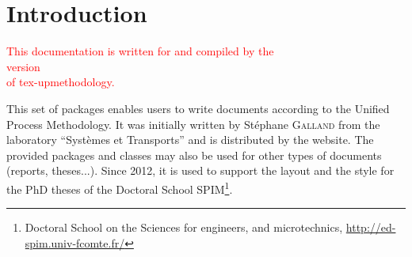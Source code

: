 \documentclass[book,taskpackage,specpackage,codepackage]{upmethodology-document}
\begin{document}
\tableofcontents

\listoftables

\listoffigures


\chapter{Introduction}

\begin{center}
\textcolor{red}{\large This documentation is written for and compiled by the\\version \UPMVERSION\\of tex-upmethodology.}
\end{center}

This set of packages enables users to write documents according to the Unified Process Methodology. It was initially written by St\'ephane \textsc{Galland} from the laboratory ``Syst\`emes et Transports'' and is distributed by the \arakhneorg website.
The provided packages and classes may also be used for other types of documents (reports, theses...). Since 2012, it is used to support the layout and the style for the PhD theses of the Doctoral School SPIM\footnote{Doctoral School on the Sciences for engineers, and microtechnics, \href{http://ed-spim.univ-fcomte.fr/}{http://ed-spim.univ-fcomte.fr/}}.
\end{document}
